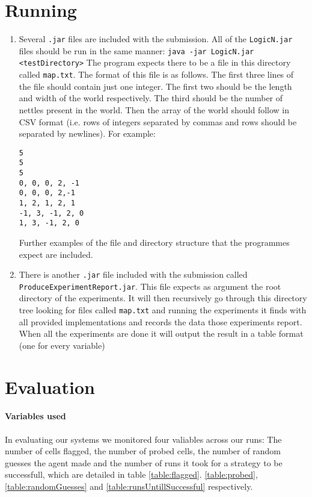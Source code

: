 \documentclass[british]{article}
\newcommand{\code}[1]{\texttt{#1}}
\begin{document}
\section{Running}
\label{running}
\begin{enumerate}
\item  Several \code{.jar} files are included with the submission. All of the \code{LogicN.jar} files should be run in the same manner: \code{java -jar LogicN.jar <testDirectory>} The program expects there to be a file in this directory called \code{map.txt}. The format of this file is as follows. The first three lines of the file should contain just one integer. The first two should be the length and width of the world respectively. The third should be the number of nettles present in the world. Then the array of the world should follow in CSV format (i.e. rows of integers separated by commas and rows should be separated by newlines). For example: \begin{lstlisting} 
5
5
5
0, 0, 0, 2, -1
0, 0, 0, 2,-1
1, 2, 1, 2, 1
-1, 3, -1, 2, 0
1, 3, -1, 2, 0
 \end{lstlisting} Further examples of the file and directory structure that the programmes expect are included.
\item There is another \code{.jar} file included with the submission called \code{ProduceExperimentReport.jar}. This file expects as argument the root directory of the experiments. It will then recursively go through this directory tree looking for files called \code{map.txt}  and running the experiments it finds with all provided implementations and records the data those experiments report. When all the experiments are done it will output the result in a table format (one for every variable)   
\end{enumerate}
 
\section{Evaluation}
\label{evals}
\paragraph{Variables used} In evaluating our systems we monitored four valiables across our runs: The number of cells flagged, the number of probed cells, the number of random guesses the agent made and the number of runs it took for a strategy to be successfull, which are detailed in table \ref{table:flagged}. \ref{table:probed}, \ref{table:randomGuesses} and \ref{table:runsUntillSuccessful} respectively. 
\end{document}
